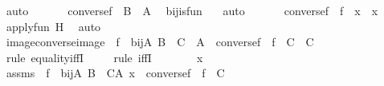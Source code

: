 \begin{isabellebody}
\ auto\ \isanewline
\ \ \isamarkupfalse%
\ \isamarkupfalse%
\ {\isachardoublequoteopen}converse{\isacharparenleft}{\kern0pt}f{\isacharparenright}{\kern0pt}\ {\isasymin}\ B\ {\isasymrightarrow}\ A{\isachardoublequoteclose}\ \isamarkupfalse%
\ bij{\isacharunderscore}{\kern0pt}is{\isacharunderscore}{\kern0pt}fun\ \ \isamarkupfalse%
\ auto\ \isanewline
\ \ \isamarkupfalse%
\ \isamarkupfalse%
\ {\isachardoublequoteopen}converse{\isacharparenleft}{\kern0pt}f{\isacharparenright}{\kern0pt}\ {\isacharbackquote}{\kern0pt}\ {\isacharparenleft}{\kern0pt}f\ {\isacharbackquote}{\kern0pt}\ x{\isacharparenright}{\kern0pt}\ {\isacharequal}{\kern0pt}\ x{\isachardoublequoteclose}\ \isamarkupfalse%
\ apply{\isacharunderscore}{\kern0pt}fun\ H\ \isamarkupfalse%
\ auto\ \isanewline
{}\isamarkupfalse%
%
\endisatagproof
{\isafoldproof}%
%
\isadelimproof
\isanewline
%
\endisadelimproof
\isanewline
{}\isamarkupfalse%
\ image{\isacharunderscore}{\kern0pt}converse{\isacharunderscore}{\kern0pt}image\ {\isacharcolon}{\kern0pt}\ {\isachardoublequoteopen}f\ {\isasymin}\ bij{\isacharparenleft}{\kern0pt}A{\isacharcomma}{\kern0pt}\ B{\isacharparenright}{\kern0pt}\ {\isasymLongrightarrow}\ C\ {\isasymsubseteq}\ A\ {\isasymLongrightarrow}\ converse{\isacharparenleft}{\kern0pt}f{\isacharparenright}{\kern0pt}\ {\isacharbackquote}{\kern0pt}{\isacharbackquote}{\kern0pt}\ {\isacharparenleft}{\kern0pt}f\ {\isacharbackquote}{\kern0pt}{\isacharbackquote}{\kern0pt}\ C{\isacharparenright}{\kern0pt}\ {\isacharequal}{\kern0pt}\ C{\isachardoublequoteclose}\ \isanewline
%
\isadelimproof
\ \ %
\endisadelimproof
%
\isatagproof
{}\isamarkupfalse%
\ {\isacharparenleft}{\kern0pt}rule\ equality{\isacharunderscore}{\kern0pt}iffI{\isacharparenright}{\kern0pt}\ \isanewline
\ \ \isamarkupfalse%
\ {\isacharparenleft}{\kern0pt}rule\ iffI{\isacharparenright}{\kern0pt}\ \isanewline
{}\isamarkupfalse%
\ {\isacharminus}{\kern0pt}\ \isanewline
\ \ \isamarkupfalse%
\ x\ \isamarkupfalse%
\ assms\ {\isacharcolon}{\kern0pt}\ {\isachardoublequoteopen}f\ {\isasymin}\ bij{\isacharparenleft}{\kern0pt}A{\isacharcomma}{\kern0pt}\ B{\isacharparenright}{\kern0pt}\ {\isachardoublequoteclose}\ {\isachardoublequoteopen}C{\isasymsubseteq}A{\isachardoublequoteclose}\ {\isachardoublequoteopen}x\ {\isasymin}\ converse{\isacharparenleft}{\kern0pt}f{\isacharparenright}{\kern0pt}\ {\isacharbackquote}{\kern0pt}{\isacharbackquote}{\kern0pt}\ {\isacharparenleft}{\kern0pt}f\ {\isacharbackquote}{\kern0pt}{\isacharbackquote}{\kern0pt}\ C{\isacharparenright}{\kern0pt}{\isachardoublequoteclose}\ \isanewline

\end{isabellebody}
